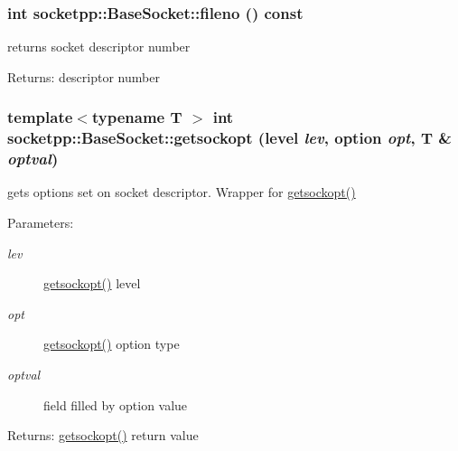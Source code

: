 \begin{CompactItemize}
{\subsubsection[{fileno}]{\setlength{\rightskip}{0pt plus 5cm}int socketpp::BaseSocket::fileno () const}}
\label{classsocketpp_1_1BaseSocket_c96db07cc917926d895d89cf73734ea1}


returns socket descriptor number 

\begin{Desc}
\item[Returns:]descriptor number \end{Desc}
\hypertarget{classsocketpp_1_1BaseSocket_c845c3a037f0f400fd50dfb58706b6e4}{
\subsubsection[{getsockopt}]{\setlength{\rightskip}{0pt plus 5cm}template$<$typename T $>$ int socketpp::BaseSocket::getsockopt (level {\em lev}, \/  option {\em opt}, \/  T \& {\em optval})}}
\label{classsocketpp_1_1BaseSocket_c845c3a037f0f400fd50dfb58706b6e4}


gets options set on socket descriptor. Wrapper for \hyperlink{classsocketpp_1_1BaseSocket_c845c3a037f0f400fd50dfb58706b6e4}{getsockopt()} 

\begin{Desc}
\item[Parameters:]
\begin{description}
\item[{\em lev}]\hyperlink{classsocketpp_1_1BaseSocket_c845c3a037f0f400fd50dfb58706b6e4}{getsockopt()} level \item[{\em opt}]\hyperlink{classsocketpp_1_1BaseSocket_c845c3a037f0f400fd50dfb58706b6e4}{getsockopt()} option type \item[{\em optval}]field filled by option value \end{description}
\end{Desc}
\begin{Desc}
\item[Returns:]\hyperlink{classsocketpp_1_1BaseSocket_c845c3a037f0f400fd50dfb58706b6e4}{getsockopt()} return value \end{Desc}
\hypertarget{classsocketpp_1_1BaseSocket_0caed2e7d3f0e4db7d4c1aa3aba52caf}{
}
\end{CompactItemize}
